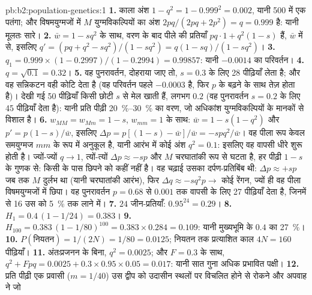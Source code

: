 \begin{solution}{pb:b2:population-genetics:1}
\textbf{1.} काला अंश $1 - q^{2} = 1 - 0.999^{2} = 0.002$,
यानी 500 में एक पतंगा; और विषमयुग्मजों में $M$ युग्मविकल्पियों का अंश
$2pq/(2pq + 2p^{2}) = q = 0.999$ है: यानी मूलतः सारे।
\textbf{2.} $\bar w = 1 - sq^{2}$ के साथ, वरण के बाद पीले  की
प्रतियाँ $pq\cdot 1 + q^{2}(1 - s)$ हैं, $\bar w$ में से, इसलिए $q'
= (pq + q^{2} - sq^{2})/(1 - sq^{2}) = q(1 - sq)/(1 - sq^{2})$।
\textbf{3.} $q_1 = 0.999\times(1 - 0.2997)/(1 - 0.2994) = 0.99857$:
यानी $-0.0014$ का परिवर्तन।
\textbf{4.} $q = \sqrt{0.1} = 0.32$।
\textbf{5.} वह पुनरावर्तन, दोहराया जाए तो, $s =
0.3$ के लिए 28 पीढ़ियाँ लेता है; और वह सन्निकटन वही कोटि देता है (वह परिवर्तन
पहले $-0.0003$ है, फिर $p$ के बढ़ने के साथ तेज़ होता है)। देखी गई 50
पीढ़ियाँ किसी छोटी $s$ से मेल खाती हैं, लगभग $0.2$ (वह पुनरावर्तन
$s = 0.2$ के लिए 45 पीढ़ियाँ देता है): यानी प्रति पीढ़ी \qtyrange{20}{30}{\%} का वरण,
जो अधिकांश युग्मविकल्पियों के मानकों से विशाल है।
\textbf{6.} $w_{MM} = w_{Mm} = 1 - s$, $w_{mm} = 1$ के साथ: $\bar w = 1
- s(1 - q^{2})$ और $p' = p(1 - s)/\bar w$, इसलिए $\Delta p = p[(1 - s) -
\bar w]/\bar w = -spq^{2}/\bar w$। वह पीला रूप केवल
समयुग्मज $mm$ के रूप में अनुकूल है, यानी आरंभ में कोई अंश $q^{2} = 0.1$: इसलिए वह
वापसी धीरे शुरू होती है। ज्यों-ज्यों $q \to 1$, त्यों-त्यों $\Delta p \approx -sp$ और $M$
चरघातांकी रूप से घटता है, हर पीढ़ी $1 - s$ के गुणक से: किसी
  के पास छिपने को कहीं नहीं है। वह चढ़ाई उसका दर्पण-प्रतिबिंब थी:
$\Delta p \approx +sp$ जब तक $M$ दुर्लभ था (यानी चरघातांकी आरंभ), फिर
$\Delta q \approx -sq^{2}p \to$ कोई रेंगन, ज्यों ही वह पीला 
विषमयुग्मजों में छिपा। वह पुनरावर्तन
$p = 0.68$ से $0.001$ तक वापसी के लिए 27 पीढ़ियाँ देता है, जिनमें से 16 उस  को \qty{5}{\%} तक लाने में।
\textbf{7.} $24$ जीन-प्रतियाँ: $0.95^{24} = 0.29$।
\textbf{8.} $H_1 = 0.4\,(1 - 1/24) = 0.383$।
\textbf{9.} $H_{100} = 0.383\,(1 - 1/80)^{100} = 0.383\times 0.284 =
0.109$: यानी मुख्यभूमि के $0.4$ का \qty{27}{\%}।
\textbf{10.} $P(\text{नियतन}) = 1/(2N) = 1/80 = 0.0125$; नियतन तक
प्रत्याशित काल $4N = 160$ पीढ़ियाँ।
\textbf{11.} अंतःप्रजनन के बिना, $q^{2} = 0.0025$; और $F = 0.3$ के साथ,
$q^{2} + Fpq = 0.0025 + 0.3\times 0.95\times 0.05 = 0.017$: यानी सात
गुना अधिक प्रभावित पक्षी।
\textbf{12.} प्रति पीढ़ी एक प्रवासी ($m = 1/40$) उस द्वीप को उदासीन
स्थलों पर विचलित होने से रोकने और अपवाह ने जो 

\end{solution}
